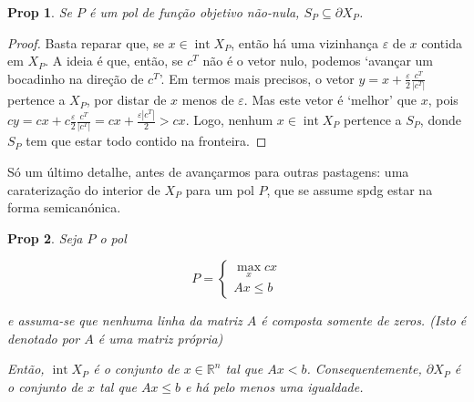 \documentclass{article}
\DeclareMathOperator{\interior}{int}
\newcommand{\R}{\mathbb{R}}
\newtheorem{prop}{Prop}
\theoremstyle{definition}
\begin{document}
	\begin{prop}
	Se $P$ é um pol de função objetivo não-nula, $S_P \subseteq \partial X_P$.
	\end{prop}
	
	\begin{proof}
	Basta reparar que, se $x \in \interior  X_P$, então há uma vizinhança $\varepsilon$ de $x$ contida em $X_P$. A ideia é que, então, se $c^T$ não é o vetor nulo, podemos `avançar um bocadinho na direção de $c^T$'. Em termos mais precisos, o vetor $y = x + \frac \varepsilon 2 \frac{c^T}{\lvert c^T \rvert}$ pertence a $X_P$, por distar de $x$ menos de $\varepsilon$. Mas este vetor é `melhor' que $x$, pois $cy = cx + c \frac \varepsilon 2 \frac {c^T}{\lvert c^T \rvert} = cx + \frac{\varepsilon |c^T|} 2 > cx$. Logo, nenhum $x \in \interior X_P$ pertence a $S_P$, donde $S_P$ tem que estar todo contido na fronteira.
	\end{proof}
	
	Só um último detalhe, antes de avançarmos para outras pastagens: uma caraterização do interior de $X_P$ para um pol $P$, que se assume spdg estar na forma semicanónica.
	
	\begin{prop}
	Seja $P$ o pol
	
	\[
	P =
	\begin{cases}
	\max\limits_x cx\\
	Ax \leq b
	\end{cases}
	\]
	
	e assuma-se que nenhuma linha da matriz $A$ é composta somente de zeros. (Isto é denotado por \emph{$A$ é uma matriz própria})
	
	Então, $\interior X_P$ é o conjunto de $x \in \R^n$ tal que $Ax < b$. Consequentemente, $\partial X_P$ é o conjunto de $x$ tal que $Ax \leq b$ e há pelo menos uma igualdade.
	\end{prop}
	
\end{document}
